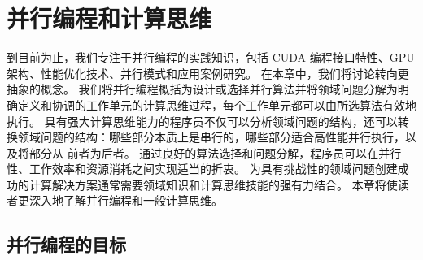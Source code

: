 \section{并行编程和计算思维}
到目前为止，我们专注于并行编程的实践知识，包括 CUDA 编程接口特性、GPU 架构、性能优化技术、并行模式和应用案例研究。 在本章中，我们将讨论转向更抽象的概念。 我们将并行编程概括为设计或选择并行算法并将领域问题分解为明确定义和协调的工作单元的计算思维过程，每个工作单元都可以由所选算法有效地执行。 具有强大计算思维能力的程序员不仅可以分析领域问题的结构，还可以转换领域问题的结构：哪些部分本质上是串行的，哪些部分适合高性能并行执行，以及将部分从 前者为后者。 通过良好的算法选择和问题分解，程序员可以在并行性、工作效率和资源消耗之间实现适当的折衷。 为具有挑战性的领域问题创建成功的计算解决方案通常需要领域知识和计算思维技能的强有力结合。 本章将使读者更深入地了解并行编程和一般计算思维。

\subsection{并行编程的目标}